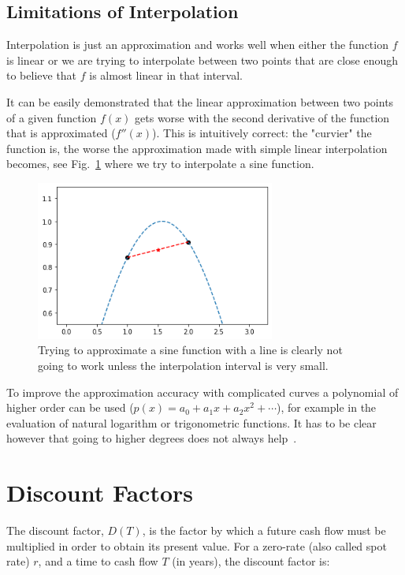 \subsection{Limitations of Interpolation}
Interpolation is just an approximation and works well when either the function $f$ is linear or we are trying to interpolate between two points that are close enough to believe that $f$ is almost linear in that interval.

It can be easily demonstrated that the linear approximation between two points of a given function $f(x)$ gets worse with the second derivative of the function that is approximated ($f''(x)$). This is intuitively correct: the "curvier" the function is, the worse the approximation made with simple linear interpolation becomes, see Fig.~\ref{fig:sine_interp} where we try to interpolate a sine function.

\begin{figure}
  \centering
  \includegraphics[width=0.7\textwidth]{figures/wrong_interp.png}
  \caption{Trying to approximate a sine function with a line is clearly not going to work unless the interpolation interval is very small.}
  \label{fig:sine_interp}
\end{figure}

To improve the approximation accuracy with complicated curves a polynomial of higher order can be used ($𝑝(𝑥)=𝑎_0 + 𝑎_1 𝑥+ 𝑎_2 𝑥^2+\cdots$), for example in the evaluation of natural logarithm or trigonometric functions. It has to be clear however that going to higher degrees does not always help~\cite{bib:runge}.

\section{Discount Factors}
\label{discount-factors}
The discount factor, $D(T)$, is the factor by which a future cash flow must be multiplied in order to obtain its present value. For a zero-rate (also called spot rate) $r$, and a time to cash flow $T$ (in years), the discount factor is:

